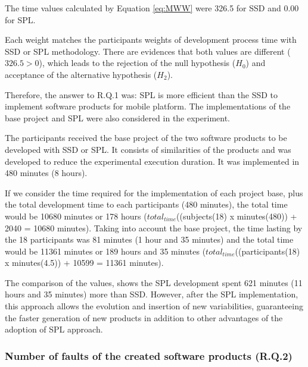 \begin{itemize}
The time values calculated by Equation \ref{eq:MWW} were 326.5 for SSD and 0.00 for SPL.

Each weight matches the participants weights of development process time with SSD or SPL methodology. There are evidences that both values are different ($326.5>0$), which leads to the rejection of the null hypothesis ($H_0$) and acceptance of the alternative hypothesis ($H_{2}$).

Therefore, the answer to R.Q.1 was: SPL is more efficient than the SSD to implement software products for mobile platform. The implementations of the base project and SPL were also considered in the experiment.

The participants received the base project of the two software products to be developed with SSD or SPL. It consists of similarities of the products and was developed to reduce the experimental execution duration. It was implemented in 480 minutes (8 hours).

If we consider the time required for the implementation of each project base, plus the total development time to each participants (480 minutes), the total time would be 10680 minutes or 178 hours ($total_{time}$((subje\allowbreak cts(18) x minutes(480)) + 2040 = 10680 minutes). Taking into account the base project, the time lasting by the 18 participants was 81 minutes (1 hour and 35 minutes) and the total time would be 11361 minutes or 189 hours and 35 minutes ($total_{time}$((participants(18) x minutes(4.5)) + 10599 = 11361 minutes). 

The comparison of the values, shows the SPL development spent 621 minutes (11 hours and 35 minutes) more than SSD. However, after the SPL implementation, this approach allows the evolution and insertion of new variabilities, guaranteeing the faster generation of new products in addition to other advantages of the adoption of SPL approach.

\end{itemize}

\subsubsection{Number of faults of the created software products (R.Q.2)}

